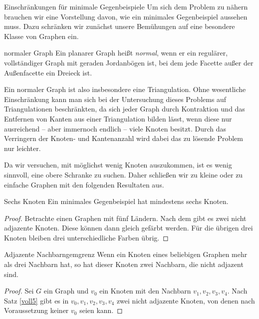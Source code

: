 \begin{section}{Einschränkungen für minimale Gegenbeispiele}
 Um sich dem Problem zu nähern brauchen wir eine Vorstellung davon, wie ein minimales Gegenbeispiel aussehen muss. Dazu schränken wir zunächst unsere Bemühungen auf eine  besondere Klasse von Graphen ein.
 
 \begin{definition}{normaler Graph}
  Ein planarer Graph heißt \textit{normal}, wenn er ein regulärer, vollständiger Graph mit geraden Jordanbögen ist, bei dem jede Facette außer der Außenfacette ein Dreieck ist.
 \end{definition}
 
 Ein normaler Graph ist also insbesondere eine Triangulation. Ohne wesentliche Einschränkung kann man sich bei der Untersuchung dieses Problems auf Triangulationen beschränkten, da sich jeder Graph durch Kontraktion und das Entfernen von Kanten aus einer Triangulation bilden lässt, wenn diese nur ausreichend -- aber immernoch endlich -- viele Knoten besitzt. Durch das Verringern der Knoten- und Kantenanzahl wird dabei das zu lösende Problem nur leichter. 
 
 Da wir versuchen, mit möglichst wenig Knoten auszukommen, ist es wenig sinnvoll, eine obere Schranke zu suchen. Daher schließen wir zu kleine oder zu einfache Graphen mit den folgenden Resultaten aus.
 
 \begin{proposition}{Sechs Knoten}
  Ein minimales Gegenbeispiel hat mindestens sechs Knoten.
 \end{proposition}
 \begin{proof}
  Betrachte einen Graphen mit fünf Ländern. Nach dem  gibt es zwei nicht adjazente Knoten. Diese können dann gleich gefärbt werden. Für die übrigen drei Knoten bleiben drei unterschiedliche Farben übrig.
 \end{proof}
 
 \begin{propositionl}{Adjazente Nachbarn}{gemgrenz}
  Wenn ein Knoten eines beliebigen Graphen mehr als drei Nachbarn hat, so hat dieser Knoten zwei Nachbarn, die nicht adjazent sind.
 \end{propositionl}
 \begin{proof}
  Sei $G$ ein Graph und $v_0$ ein Knoten mit den Nachbarn $v_1,v_2,v_3,v_4$. Nach Satz \ref{voll5} gibt es in $v_0,v_1,v_2,v_3,v_4$ zwei nicht adjazente Knoten, von denen nach Voraussetzung keiner $v_0$ seien kann.
 \end{proof}
 

\end{section}
